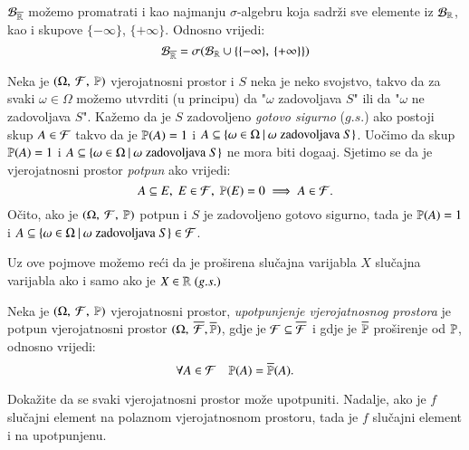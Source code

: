 \begin{nap} \label{nap:3.8.1}
    $\mathcal{B}_{\overline{\mathbb{R}}}$ mo\v zemo promatrati i kao najmanju $\sigma$-algebru koja sadr\v zi sve elemente iz $\mathcal{B}_{\mathbb{R}}$, kao i skupove $\{-\infty\}$, $\{+\infty\}$.
    Odnosno vrijedi:
    \begin{equation*}
        \mathcal{B}_{\overline{\mathbb{R}}} = \sigma({\mathcal{B}_{\mathbb{R}} \cup \{\{-\infty\}, \: \{+\infty\}\}})
    \end{equation*}
\end{nap}

\begin{nap} \label{nap:3.9}
    Neka je $(\Omega, \: \mathcal{F}, \: \mathbb{P})$ vjerojatnosni prostor i $S$ neka je neko svojstvo, takvo da za svaki $\omega \in \Omega$ mo\v zemo utvrditi (u principu) da "$\omega$ zadovoljava $S$" ili da "$\omega$ ne zadovoljava $S$".
    Ka\v zemo da je $S$ zadovoljeno \emph{gotovo sigurno} ($g.s.$) ako postoji skup $A \in \mathcal{F}$ takvo da je $\mathbb{P}({A}) = 1$ i $A \subseteq \{{\omega \in \Omega} \: | \: {\omega \; \textnormal{zadovoljava} \; S}\}$.
    Uo\v cimo da skup $\mathbb{P}({A}) = 1$ i $A \subseteq \{{\omega \in \Omega} \: | \: {\omega \; \textnormal{zadovoljava} \; S}\}$ ne mora biti doga\dj aj.
    Sjetimo se da je vjerojatnosni prostor \emph{potpun} ako vrijedi:
    \begin{equation*}
        A \subseteq E, \; E \in \mathcal{F}, \; \mathbb{P}({E}) = 0 \implies A \in \mathcal{F}.
    \end{equation*}
    O\v cito, ako je $(\Omega, \: \mathcal{F}, \: \mathbb{P})$ potpun i $S$ je zadovoljeno gotovo sigurno, tada je $\mathbb{P}({A}) = 1$ i $A \subseteq \{{\omega \in \Omega} \: | \: {\omega \; \textnormal{zadovoljava} \; S}\} \in \mathcal{F}$.

    Uz ove pojmove mo\v zemo re\' ci da je pro\v sirena slu\v cajna varijabla $X$ slu\v cajna varijabla ako i samo ako je $X \in \mathbb{R} \; (g.s.)$
\end{nap}

\begin{nap} \label{nap:3.9-1}
    Neka je $(\Omega, \: \mathcal{F}, \: \mathbb{P})$ vjerojatnosni prostor, \emph{upotpunjenje vjerojatnosnog prostora} je potpun vjerojatnosni prostor $(\Omega, \: \overline{\mathcal{F}}, \overline{\mathbb{P}})$, gdje je $\mathcal{F} \subseteq \overline{\mathcal{F}}$ i gdje je $\overline{\mathbb{P}}$ pro\v sirenje od $\mathbb{P}$, odnosno vrijedi:
    \begin{equation*}
        \forall A \in \mathcal{F} \quad \mathbb{P}({A}) = \overline{\mathbb{P}}(A).
    \end{equation*}
\end{nap}

\begin{zad} \label{zad:3.10}
    Doka\v zite da se svaki vjerojatnosni prostor mo\v ze upotpuniti.
    Nadalje, ako je $f$ slu\v cajni element na polaznom vjerojatnosnom
    prostoru, tada je $f$ slu\v cajni element i na upotpunjenu.
\end{zad}


